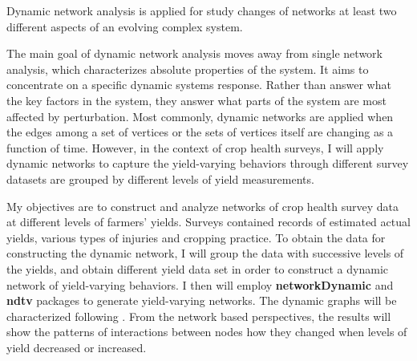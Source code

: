 Dynamic network analysis is applied for study changes of networks at least two different aspects of an evolving complex system. 

The main goal of dynamic network analysis moves away from single network analysis, which characterizes absolute properties of the system. It aims to concentrate on a specific dynamic systems response. Rather than answer what the key factors in the system, they answer what parts of the system are most affected by perturbation. Most commonly, dynamic networks are applied when the edges among a set of vertices or the sets of vertices itself are changing as a function of time. However, in the context of crop health surveys, I will apply dynamic networks to capture the yield-varying behaviors through different survey datasets are grouped by different levels of yield measurements.


My objectives are to construct and analyze networks of crop health survey data at different levels of farmers' yields. Surveys contained records of estimated actual yields, various types of injuries and cropping practice. To obtain the data for constructing the dynamic network, I will group the data with successive levels of the yields, and obtain different yield data set in order to construct a dynamic network of yield-varying behaviors. I then will employ \textbf{networkDynamic}  and \textbf{ndtv}  packages to generate yield-varying networks. The dynamic graphs will be characterized following . From the network based perspectives, the results will show the patterns of interactions between nodes how they changed when levels of yield decreased or increased.

